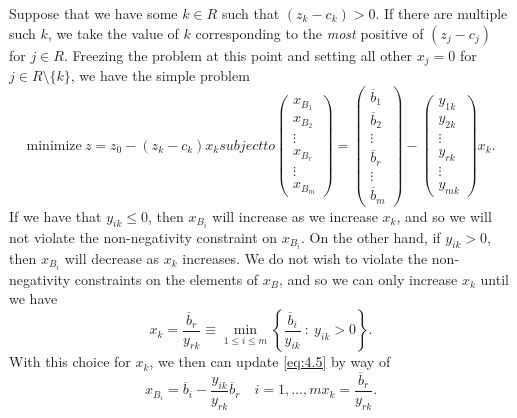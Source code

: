 \documentclass[12pt,english]{article}
\begin{document}
Suppose that we have some $k \in R$ such that $(z_k - c_k)>0$.  If there are multiple such $k$, we take the value of $k$ corresponding to the {\it most} positive of $(z_j - c_j)$ for $j \in R$.  Freezing the problem at this point and setting all other $x_j = 0$ for $j \in R \setminus \{k\}$, we have the simple problem
\begin{subequations}
\begin{equation}\label{eq:4.4}
\text{minimize} ~ z = z_0 - (z_k - c_k)x_k
\end{equation}
subject to 
\begin{equation}\label{eq:4.5}
\left(
\begin{array}{c}
x_{B_1} \\
x_{B_2} \\
\vdots \\
x_{B_r} \\
\vdots \\
x_{B_m}
\end{array}
\right)
=
\left(
\begin{array}{c}
\overline{b}_1 \\
\overline{b}_2 \\
\vdots \\
\overline{b}_r \\
\vdots \\
\overline{b}_m
\end{array}
\right)
-
\left(
\begin{array}{c}
y_{1k} \\
y_{2k} \\
\vdots  \\
y_{rk} \\
\vdots \\
y_{mk}
\end{array}
\right)
x_k.
\end{equation}
\end{subequations}
If we have that $y_{ik} \leq 0$, then $x_{B_i}$ will increase as we increase $x_k$, and so we will not violate the non-negativity constraint on $x_{B_i}$.   On the other hand, if $y_{ik} >0$, then $x_{B_i}$ will decrease as $x_k$ increases.  We do not wish to violate the non-negativity constraints on the elements of $x_B$, and so we can only increase $x_k$ until we have 
$$
x_k = \frac{\overline{b}_r}{y_{rk}} \equiv \min_{1 \leq i \leq m} \left\{ \frac{\overline{b}_i}{y_{ik}} ~:~ y_{ik} >0 \right\}.
$$
With this choice for $x_k$, we then can update \eqref{eq:4.5} by way of 
\begin{subequations}
\begin{equation}\label{eq:4.6}
x_{B_i} = \overline{b}_i - \frac{y_{ik}}{y_{rk}} \overline{b}_r \quad i=1,\dots,m
\end{equation}
\begin{equation}\label{eq:4.7}
x_k = \frac{\overline{b}_r}{y_{rk}}.
\end{equation}
\end{subequations}
\end{document}
